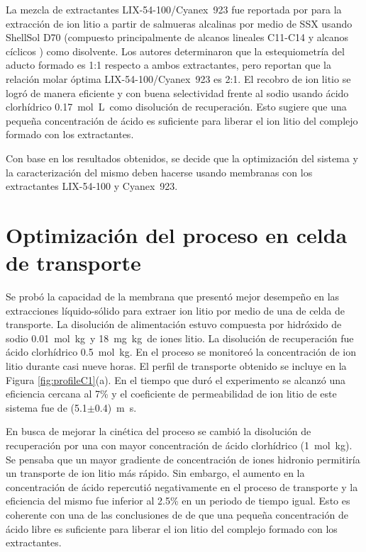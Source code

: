 La mezcla de extractantes LIX-54-100/Cyanex~923 fue reportada por \citet{Pranolo2015} para la extracción de ion litio a partir de salmueras alcalinas por medio de \ac{SSX} usando ShellSol D70 (compuesto principalmente de alcanos lineales C11-C14 y alcanos cíclicos \citep{Shell2016}) como disolvente. Los autores determinaron que la estequiometría del aducto formado es 1:1 res\-pecto a ambos extractantes, pero reportan que la relación molar óptima LIX-54-100/Cyanex~923 es 2:1. El recobro de ion litio se logró de manera eficiente y con buena selectividad frente al sodio usando ácido clorhídrico 0.17~mol~L\mnn\ como disolución de recuperación. Esto sugiere que una pequeña concentración de ácido es suficiente para liberar el ion litio del complejo formado con los extractantes.

Con base en los resultados obtenidos, se decide que la optimización del sistema y la caracterización del mismo deben hacerse usando membranas con los extractantes LIX-54-100 y Cyanex~923.

\section{Optimización del proceso en celda de transporte}
Se probó la capacidad de la membrana que presentó mejor desempeño en las extracciones líquido-sólido para extraer ion litio por medio de una de celda de transporte. La disolución de alimentación estuvo compuesta por hidróxido de sodio 0.01~mol~kg\mnn\ y 18~mg~kg\mnn\ de iones litio. La disolución de recuperación fue ácido clorhídrico 0.5~mol~kg\mnn. En el proceso se monitoreó la concentración de ion litio durante casi nueve horas. El perfil de transporte obtenido se incluye en la Figura \ref{fig:profileC1}(a). En el tiempo que duró el experimento se alcanzó una eficiencia cercana al 7\% y el coeficiente de permeabilidad de ion litio de este sistema fue de (5.1$\pm$0.4)~m~s\mnn. 

En busca de mejorar la cinética del proceso se cambió la disolución de recuperación por una con mayor concentración de ácido clorhídrico (1~mol~kg\mnn). Se pensaba que un mayor gradiente de concentración de iones hidronio permitiría un transporte de ion litio más rápido. Sin embargo, el aumento en la concentración de ácido repercutió negativamente en el proceso de transporte y la eficiencia del mismo fue inferior al 2.5\% en un periodo de tiempo igual. Esto es coherente con una de las conclusiones de \citet{Pranolo2015} de que una pequeña concentración de ácido libre es suficiente para liberar el ion litio del complejo formado con los extractantes.

